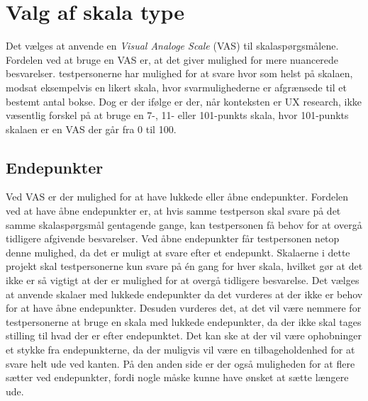 \section{Valg af skala type}
\label{ParametreSkalaType}
%
Det vælges at anvende en \textit{Visual Analoge Scale} (VAS) til skalaspørgsmålene. Fordelen ved at bruge en VAS er, at det giver mulighed for mere nuancerede besvarelser. testpersonerne har mulighed for at svare hvor som helst på skalaen, modsat eksempelvis en likert skala, hvor svarmulighederne er afgrænsede til et bestemt antal bokse.
Dog er der ifølge \textcite[s. 73]{PDF:RatingScales} er der, når konteksten er UX research, ikke væsentlig forskel på at bruge en 7-, 11- eller 101-punkts skala, hvor 101-punkts skalaen er en VAS der går fra 0 til 100.  
%
\subsection{Endepunkter}
Ved VAS er der mulighed for at have lukkede eller åbne endepunkter. Fordelen ved at have åbne endepunkter er, at hvis samme testperson skal svare på det samme skalaspørgsmål gentagende gange, kan testpersonen få behov for at overgå tidligere afgivende besvarelser. Ved åbne endepunkter får testpersonen netop denne mulighed, da det er muligt at svare efter et endepunkt. Skalaerne i dette projekt skal testpersonerne kun svare på én gang for hver skala, hvilket gør at det ikke er så vigtigt at der er mulighed for at overgå tidligere besvarelse. \blankline
%
Det vælges at anvende skalaer med lukkede endepunkter da det vurderes at der ikke er behov for at have åbne endepunkter. Desuden vurderes det, at det vil være nemmere for testpersonerne at bruge en skala med lukkede endepunkter, da der ikke skal tages stilling til hvad der er efter endepunktet. Det kan ske at der vil være ophobninger et stykke fra endepunkterne, da der muligvis vil være en tilbageholdenhed for at svare helt ude ved kanten. På den anden side er der også muligheden for at flere sætter ved endepunkter, fordi nogle måske kunne have ønsket at sætte længere ude. 
%
%
